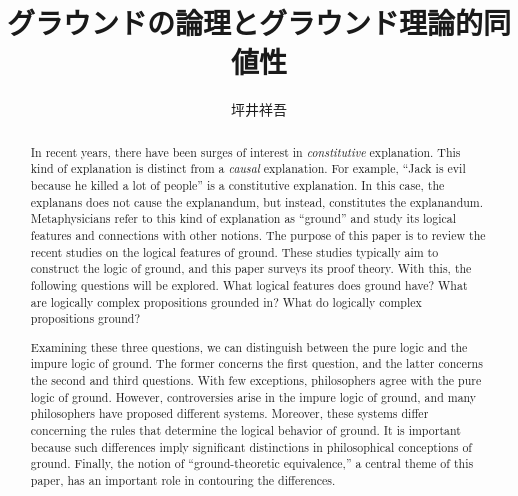 \documentclass[twoside,14Q,uplatex,dvipdfmx]{jsarticle}
\title{グラウンドの論理とグラウンド理論的同値性%
}
\author{坪井祥吾}
\date{}
\theoremstyle{definition}
\begin{document}
\maketitle


\begin{abstract}
In recent years, there have been surges of interest in \emph{constitutive} explanation. This kind of explanation is distinct from a \emph{causal} explanation. For example, ``Jack is evil because he killed a lot of people'' is a constitutive explanation. In this case, the explanans does not cause the explanandum, but instead, constitutes the explanandum. Metaphysicians refer to this kind of explanation as ``ground'' and study its logical features and connections with other notions.  The purpose of this paper is to review the recent studies on the logical features of ground. These studies typically aim to construct the logic of ground, and this paper surveys its proof theory. With this, the following questions will be explored. What logical features does ground have? What are logically complex propositions grounded in? What do logically complex propositions ground? 

Examining these three questions, we can distinguish between the pure logic and the impure logic of ground. The former concerns the first question, and the latter concerns the second and third questions. With few exceptions, philosophers agree with the pure logic of ground. However, controversies arise in the impure logic of ground, and many philosophers have proposed different systems. Moreover, these systems differ concerning the rules that determine the logical behavior of ground. It is important because such differences imply significant distinctions in philosophical conceptions of ground. Finally, the notion of ``ground-theoretic equivalence,'' a central theme of this paper, has an important role in contouring the differences.
\\

{}
\end{abstract}
\end{document}
